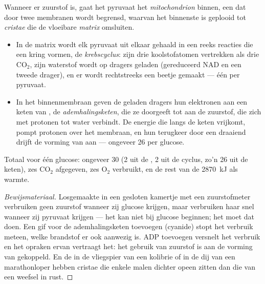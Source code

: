 \begin{proposition}\label{prop:g12:respiration-fermentation:mitochondrion}
Wanneer er zuurstof is, gaat het pyruvaat het \emph{mitochondrion}
binnen, een  dat door twee membranen wordt begrensd, waarvan het
binnenste is geplooid tot \emph{cristae} die de vloeibare \emph{matrix}
omsluiten.
\begin{itemize}
  \item In de matrix wordt elk pyruvaat uit elkaar gehaald in een reeks
        reacties die een kring vormen, de \emph{krebscyclus}:
        zijn drie koolstofatomen vertrekken als drie $\mathrm{CO_2}$, zijn
        waterstof wordt op dragers geladen (gereduceerd NAD en een tweede
        drager), en er wordt rechtstreeks een beetje  gemaakt --- één
        per pyruvaat.
  \item In het binnenmembraan geven de geladen dragers hun elektronen aan
        een keten van , de \emph{ademhalingsketen}, die ze
        doorgeeft tot aan de zuurstof, die zich met protonen tot water
        verbindt. De energie die langs de keten vrijkomt, pompt protonen
        over het membraan, en hun terugkeer door een draaiend  drijft
        de vorming van  aan --- ongeveer 26 per glucose.
\end{itemize}
Totaal voor één glucose: ongeveer 30  (2 uit de , 2 uit de
cyclus, zo'n 26 uit de keten), zes $\mathrm{CO_2}$ afgegeven, zes
$\mathrm{O_2}$ verbruikt, en de rest van de \qty{2870}{kJ} als warmte.
\end{proposition}
\begin{proof}[Bewijsmateriaal]
Losgemaakte  in een gesloten kamertje met een zuurstofmeter
verbruiken geen zuurstof wanneer zij glucose krijgen, maar verbruiken haar
snel wanneer zij pyruvaat krijgen --- het  kan niet bij
glucose beginnen; het  moet dat doen. Een gif voor de
ademhalingsketen toevoegen (cyanide) stopt het verbruik meteen, welke
brandstof er ook aanwezig is. ADP toevoegen versnelt het verbruik en het
opraken ervan vertraagt het: het gebruik van zuurstof is aan de vorming
van  gekoppeld. En de  in de vliegspier van een kolibrie
of in de dij van een marathonloper hebben cristae die enkele malen dichter
opeen zitten dan die van een weefsel in rust.
\end{proof}

